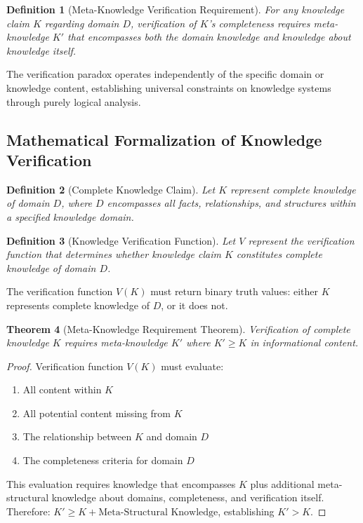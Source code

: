 \documentclass[12pt,a4paper]{article}
\newtheorem{theorem}{Theorem}[section]
\newtheorem{definition}[theorem]{Definition}
\begin{document}
\begin{definition}[Meta-Knowledge Verification Requirement]
For any knowledge claim $K$ regarding domain $D$, verification of $K$'s completeness requires meta-knowledge $K'$ that encompasses both the domain knowledge and knowledge about knowledge itself.
\end{definition}

The verification paradox operates independently of the specific domain or knowledge content, establishing universal constraints on knowledge systems through purely logical analysis.

\subsection{Mathematical Formalization of Knowledge Verification}

\begin{definition}[Complete Knowledge Claim]
Let $K$ represent complete knowledge of domain $D$, where $D$ encompasses all facts, relationships, and structures within a specified knowledge domain.
\end{definition}

\begin{definition}[Knowledge Verification Function]
Let $V$ represent the verification function that determines whether knowledge claim $K$ constitutes complete knowledge of domain $D$.
\end{definition}

The verification function $V(K)$ must return binary truth values: either $K$ represents complete knowledge of $D$, or it does not.

\begin{theorem}[Meta-Knowledge Requirement Theorem]
Verification of complete knowledge $K$ requires meta-knowledge $K'$ where $K' \geq K$ in informational content.
\end{theorem}

\begin{proof}
Verification function $V(K)$ must evaluate:
\begin{enumerate}
\item All content within $K$
\item All potential content missing from $K$
\item The relationship between $K$ and domain $D$
\item The completeness criteria for domain $D$
\end{enumerate}

This evaluation requires knowledge that encompasses $K$ plus additional meta-structural knowledge about domains, completeness, and verification itself. Therefore: $K' \geq K + \text{Meta-Structural Knowledge}$, establishing $K' > K$.
\end{proof}
\end{document}

